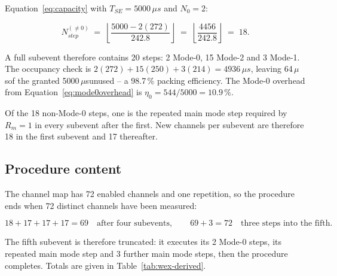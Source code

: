 \documentclass[11pt,a4paper]{article}
\newcommand{\us}{\,\ensuremath{\upmu}s}
\newcommand{\Tse}{T_{SE}}
\newcommand{\Nst}{N_{step}}
\providecommand{\upmu}{\mu}
\begin{document}
Equation~\eqref{eq:capacity} with $\Tse = 5000\us$ and $N_0 = 2$:

\begin{equation*}
\Nst^{(\ne 0)} \;=\; \left\lfloor \frac{5000 - 2(272)}{242.8} \right\rfloor
              \;=\; \left\lfloor \frac{4456}{242.8} \right\rfloor \;=\; 18 .
\end{equation*}

A full subevent therefore contains 20 steps: 2 Mode-0, 15 Mode-2 and 3 Mode-1. The occupancy check is
$2(272) + 15(250) + 3(214) = 4936\us$, leaving 64\us of the granted 5000\us unused --
a 98.7\,\% packing efficiency. The Mode-0 overhead from Equation~\eqref{eq:mode0overhead} is
$\eta_0 = 544/5000 = 10.9\,\%$.

Of the 18 non-Mode-0 steps, one is the repeated main mode step required by $R_m = 1$ in every
subevent after the first. New channels per subevent are therefore 18 in the first subevent and 17
thereafter.

\subsection{Procedure content}

The channel map has 72 enabled channels and one repetition, so the procedure ends when 72 distinct
channels have been measured:

\begin{equation*}
18 + 17 + 17 + 17 = 69 \quad\text{after four subevents},\qquad
69 + 3 = 72 \quad\text{three steps into the fifth}.
\end{equation*}

The fifth subevent is therefore truncated: it executes its 2 Mode-0 steps, its repeated main mode
step and 3 further main mode steps, then the procedure completes. Totals are given in
Table~\ref{tab:wex-derived}.
\end{document}
